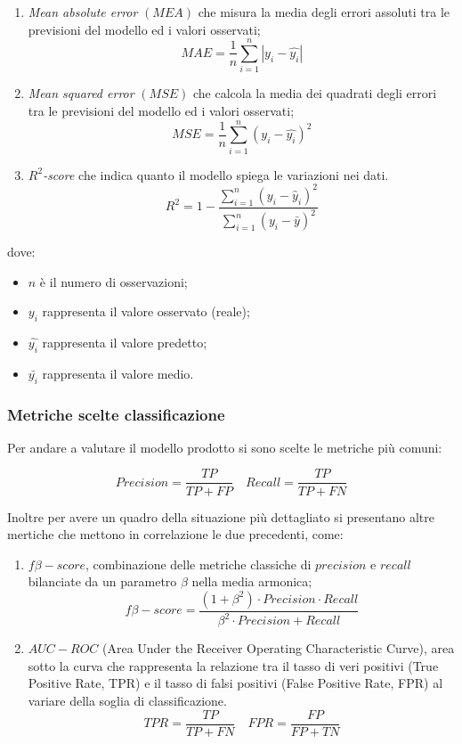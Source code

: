 \documentclass[italian,12pt,a4paper]{article}
\begin{document}
				\begin{enumerate}
					\item\textit{ Mean absolute error} $(MEA)$ che misura la media degli errori assoluti tra le previsioni del modello ed i valori osservati; $$MAE = \frac{1}{n}\sum_{i = 1}^{n}|y_i - \hat{y_i}|$$
					\item \textit{Mean squared error} $(MSE)$ che calcola la media dei quadrati degli errori tra le previsioni del modello ed i valori osservati; $$MSE = \frac{1}{n}\sum_{i = 1}^{n}(y_i - \hat{y_i})^2$$
					\item \textit{$R^2$-score} che indica quanto il modello spiega le variazioni nei dati. $$R^2 = 1 - \frac{\sum_{i=1}^{n}(y_i - \hat{y}_i)^2}{\sum_{i=1}^{n}(y_i - \bar{y})^2} $$
				\end{enumerate}
	
				dove:
				\begin{itemize}
					\item $n$ è il numero di osservazioni;
					\item $y_i$ rappresenta il valore osservato (reale);
					\item $\hat{y_i}$ rappresenta il valore predetto;
					\item $\bar{y_i}$ rappresenta il valore medio.
				\end{itemize}

	
			\subsubsection{Metriche scelte classificazione}
				Per andare a valutare il modello prodotto si sono scelte le metriche più comuni:
	
				$$Precision = \frac{TP}{TP+FP} \quad Recall = \frac{TP}{TP+FN}$$

				Inoltre per avere un quadro della situazione più dettagliato si presentano altre mertiche che mettono in correlazione le due precedenti, come:
				
		
				\begin{enumerate}
					\item $f\beta-score$,  combinazione delle metriche classiche di $precision$ e $recall$ bilanciate da un parametro $\beta$ nella media armonica;
					$$f\beta-score = \frac{(1+ \beta^2) \cdot Precision \cdot Recall}{\beta^2 \cdot Precision + Recall}$$
					\item $AUC-ROC$ (Area Under the Receiver Operating Characteristic Curve), area sotto la curva che rappresenta la relazione tra il tasso di veri positivi (True Positive Rate, TPR) e il tasso di falsi positivi (False Positive Rate, FPR) al variare della soglia di classificazione.
					$$TPR = \frac{TP}{TP+FN} \quad FPR = \frac{FP}{FP+TN}$$
				\end{enumerate} 
\end{document}
